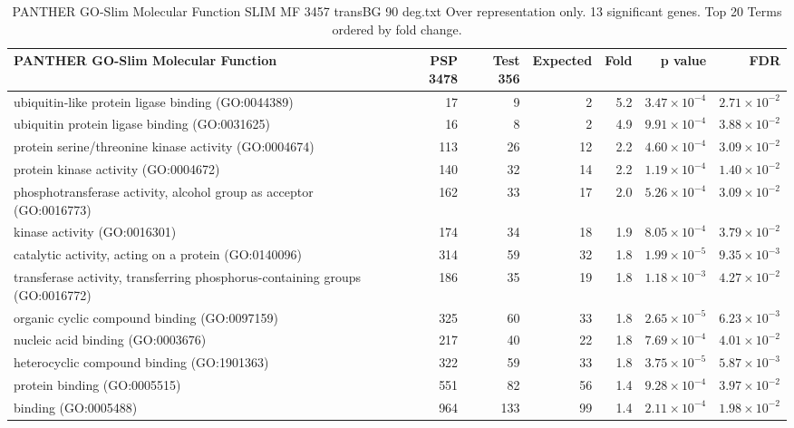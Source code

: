 \begin{table}[ht]
\centering
\begin{adjustbox}{width=\textwidth}
\begin{tabular}{lrrrrrr}
  \hline
PANTHER GO-Slim Molecular Function & PSP 3478 & Test 356 & Expected & Fold & p value & FDR \\ 
  \hline
ubiquitin-like protein ligase binding (GO:0044389) & 17 & 9 & 2 & 5.2 & $3.47 \times 10^{-4}$ & $2.71 \times 10^{-2}$ \\ 
  ubiquitin protein ligase binding (GO:0031625) & 16 & 8 & 2 & 4.9 & $9.91 \times 10^{-4}$ & $3.88 \times 10^{-2}$ \\ 
  protein serine/threonine kinase activity (GO:0004674) & 113 & 26 & 12 & 2.2 & $4.60 \times 10^{-4}$ & $3.09 \times 10^{-2}$ \\ 
  protein kinase activity (GO:0004672) & 140 & 32 & 14 & 2.2 & $1.19 \times 10^{-4}$ & $1.40 \times 10^{-2}$ \\ 
  phosphotransferase activity, alcohol group as acceptor (GO:0016773) & 162 & 33 & 17 & 2.0 & $5.26 \times 10^{-4}$ & $3.09 \times 10^{-2}$ \\ 
  kinase activity (GO:0016301) & 174 & 34 & 18 & 1.9 & $8.05 \times 10^{-4}$ & $3.79 \times 10^{-2}$ \\ 
  catalytic activity, acting on a protein (GO:0140096) & 314 & 59 & 32 & 1.8 & $1.99 \times 10^{-5}$ & $9.35 \times 10^{-3}$ \\ 
  transferase activity, transferring phosphorus-containing groups (GO:0016772) & 186 & 35 & 19 & 1.8 & $1.18 \times 10^{-3}$ & $4.27 \times 10^{-2}$ \\ 
  organic cyclic compound binding (GO:0097159) & 325 & 60 & 33 & 1.8 & $2.65 \times 10^{-5}$ & $6.23 \times 10^{-3}$ \\ 
  nucleic acid binding (GO:0003676) & 217 & 40 & 22 & 1.8 & $7.69 \times 10^{-4}$ & $4.01 \times 10^{-2}$ \\ 
  heterocyclic compound binding (GO:1901363) & 322 & 59 & 33 & 1.8 & $3.75 \times 10^{-5}$ & $5.87 \times 10^{-3}$ \\ 
  protein binding (GO:0005515) & 551 & 82 & 56 & 1.4 & $9.28 \times 10^{-4}$ & $3.97 \times 10^{-2}$ \\ 
  binding (GO:0005488) & 964 & 133 & 99 & 1.4 & $2.11 \times 10^{-4}$ & $1.98 \times 10^{-2}$ \\ 
   \hline
\end{tabular}
\end{adjustbox}
\caption{PANTHER GO-Slim Molecular Function SLIM MF 3457 transBG 90 deg.txt Over representation only. 13 significant genes. Top 20 Terms ordered by fold change. } 
\label{tab:PANTHER GO-Slim Molecular Function SLIM MF 3457 transBG 90 deg.txt Over representation only. 13 significant genes. Top 20 Terms ordered by fold change. }
\end{table}


